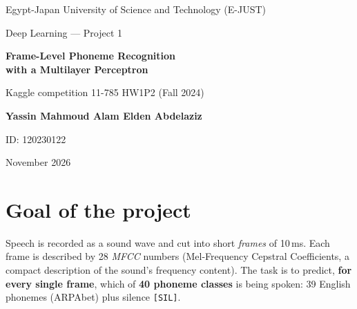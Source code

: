 \documentclass[11pt,a4paper]{article}
\begin{document}
\begin{titlepage}
\centering
\vspace*{2.5cm}
{\large Egypt-Japan University of Science and Technology (E-JUST)\par}
\vspace{0.3cm}
{\large Deep Learning --- Project 1\par}
\vspace{2.5cm}
{\LARGE\bfseries Frame-Level Phoneme Recognition\\[4pt] with a Multilayer Perceptron\par}
\vspace{0.6cm}
{\large Kaggle competition 11-785 HW1P2 (Fall 2024)\par}
\vspace{3cm}
{\large\bfseries Yassin Mahmoud Alam Elden Abdelaziz\par}
\vspace{0.2cm}
{\large ID: 120230122\par}
\vfill
{\large November 2026\par}
\end{titlepage}

\tableofcontents
\vspace{0.6cm}

\begin{center}
\end{center}

\newpage
\section{Goal of the project}

Speech is recorded as a sound wave and cut into short \emph{frames} of 10\,ms. Each frame is described by
28 \emph{MFCC} numbers (Mel-Frequency Cepstral Coefficients, a compact description of the sound's
frequency content). The task is to predict, \textbf{for every single frame}, which of \textbf{40 phoneme
classes} is being spoken: 39 English phonemes (ARPAbet) plus silence \texttt{[SIL]}.
\end{document}
